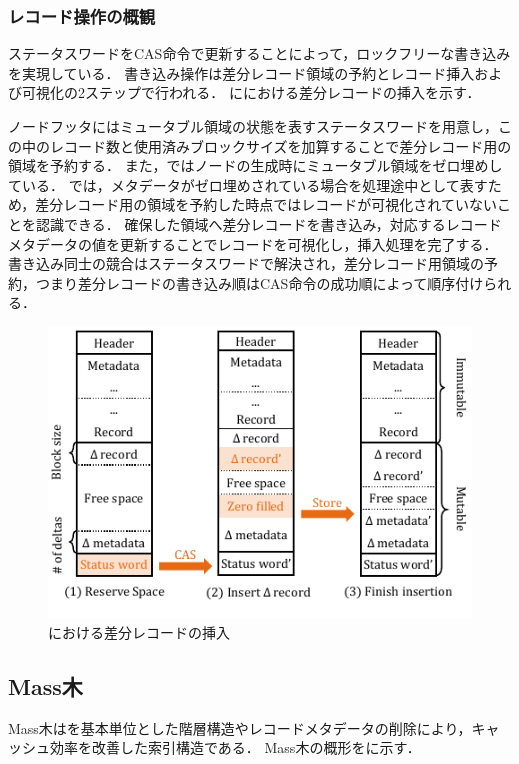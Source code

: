 \subsubsection{レコード操作の概観}
ステータスワードをCAS命令で更新することによって，ロックフリーな書き込みを実現している．
書き込み操作は差分レコード領域の予約とレコード挿入および可視化の2ステップで行われる．
\Fig{\ref{fig:bc_tree_insertion}}に\Bctree{}における差分レコードの挿入を示す．

ノードフッタにはミュータブル領域の状態を表すステータスワードを用意し，この中のレコード数と使用済みブロックサイズを加算することで差分レコード用の領域を予約する．
また，\Bctree{}ではノードの生成時にミュータブル領域をゼロ埋めしている．
\Bctree{}では，メタデータがゼロ埋めされている場合を処理途中として表すため，差分レコード用の領域を予約した時点ではレコードが可視化されていないことを認識できる．
確保した領域へ差分レコードを書き込み，対応するレコードメタデータの値を更新することでレコードを可視化し，挿入処理を完了する．
書き込み同士の競合はステータスワードで解決され，差分レコード用領域の予約，つまり差分レコードの書き込み順はCAS命令の成功順によって順序付けられる．

\begin{figure}[t]
    \centering
    \includegraphics{./figures/Bc-insertion.pdf}
    \caption{\Bctree{}における差分レコードの挿入}
    \label{fig:bc_tree_insertion}
\end{figure}

\subsection{Mass木}
Mass木は\Bptree{}を基本単位とした階層構造やレコードメタデータの削除により，キャッシュ効率を改善した索引構造である．
Mass木の概形を\Fig{\ref{fig:masstree}}に示す．

